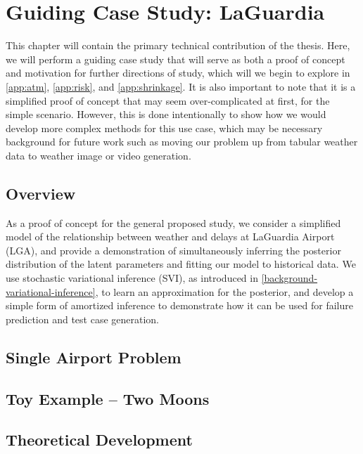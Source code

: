 \chapter{Guiding Case Study: LaGuardia}
\label{ch:atrds}

This chapter will contain the primary technical contribution of the thesis. Here, we will perform a guiding case study that will serve as both a proof of concept and motivation for further directions of study, which will we begin to explore in \cref{app:atm}, \cref{app:risk}, and \cref{app:shrinkage}. It is also important to note that it is a simplified proof of concept that may seem over-complicated at first, for the simple scenario. However, this is done intentionally to show how we would develop more complex methods for this use case, which may be necessary background for future work such as moving our problem up from tabular weather data to weather image or video generation.

\section{Overview}

As a proof of concept for the general proposed study, we consider a simplified model of the relationship between weather and delays at LaGuardia Airport (LGA), and provide a demonstration of simultaneously inferring the posterior distribution of the latent parameters and fitting our model to historical data. We use stochastic variational inference (SVI), as introduced in \cref{background-variational-inference}, to learn an approximation for the posterior, and develop a simple form of amortized inference to demonstrate how it can be used for failure prediction and test case generation. 

\section{Single Airport Problem}
\label{sec:atrds-single-airport}


\section{Toy Example -- Two Moons}
\label{sec:atrds-moons}


\section{Theoretical Development}
\label{sec:atrds-theory}



